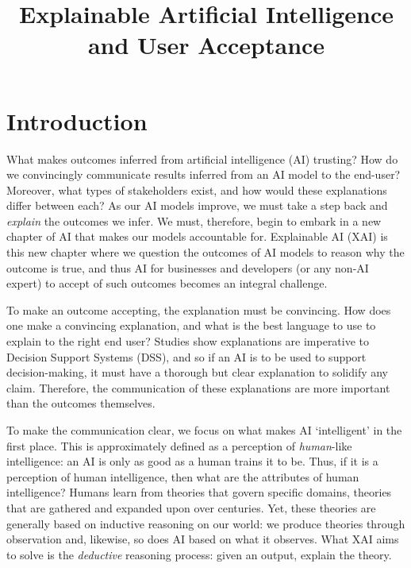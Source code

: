 \documentclass[a4paper,11pt]{article}
\title{Explainable Artificial Intelligence and User Acceptance}
\begin{document}
  
\maketitle

\section{Introduction}

What makes outcomes inferred from artificial intelligence (AI) trusting? How do we convincingly communicate results inferred from an AI model to the end-user? Moreover, what types of stakeholders exist, and how would these explanations differ between each? As our AI models improve, we must take a step back and \textit{explain} the outcomes we infer. We must, therefore, begin to embark in a new chapter of AI that makes our models accountable for. Explainable AI (XAI) is this new chapter where we question the outcomes of AI models to reason why the outcome is true, and thus AI for businesses and developers (or any non-AI expert) to accept of such outcomes becomes an integral challenge.

To make an outcome accepting, the explanation must be convincing. How does one make a convincing explanation, and what is the best language to use to explain to the right end user? Studies show explanations are imperative to Decision Support Systems (DSS), and so if an AI is to be used to support decision-making, it must have a thorough but clear explanation to solidify any claim. Therefore, the communication of these explanations are more important than the outcomes themselves.

To make the communication clear, we focus on what makes AI `intelligent' in the first place. This is approximately defined as a perception of \textit{human}-like intelligence: an AI is only as good as a human trains it to be. Thus, if it is a perception of human intelligence, then what are the attributes of human intelligence? Humans learn from theories that govern specific domains, theories that are gathered and expanded upon over centuries. Yet, these theories are generally based on inductive reasoning on our world: we produce theories through observation and, likewise, so does AI based on what it observes. What XAI aims to solve is the \textit{deductive} reasoning process: given an output, explain the theory.

% 
\end{document}
